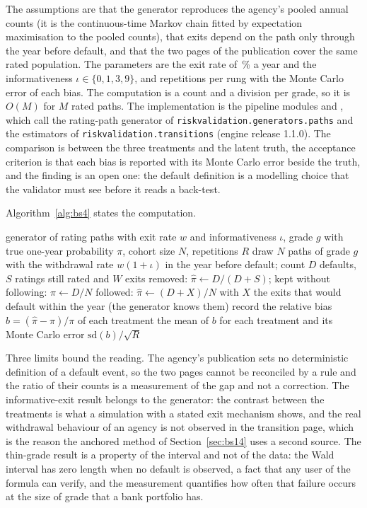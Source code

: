 The assumptions are that the generator reproduces the agency's pooled annual counts (it is the continuous-time Markov chain fitted by expectation
maximisation to the pooled counts), that exits depend on the path only through the year before default, and that the two pages of the publication cover
the same rated population. The parameters are the exit rate of \pxFourteenExitRate{}\,\% a year and the informativeness $\iota\in\{0,1,3,9\}$, and \pxFourReps{} repetitions per rung with the Monte Carlo error of each bias. The computation is a count and a division per grade, so it is
$O(M)$ for $M$ rated paths. The implementation is the pipeline modules  and , which call the rating-path generator
of \texttt{riskvalidation.generators.paths} and the estimators of \texttt{riskvalidation.transitions} (engine release 1.1.0). The comparison is between the three
treatments and the latent truth, the acceptance criterion is that each bias is reported with its Monte Carlo error beside the truth, and the finding is
an open one: the default definition is a modelling choice that the validator must see before it reads a back-test.

Algorithm~\ref{alg:bs4} states the computation.

\begin{algorithm}[htbp]
\caption{The three treatments of exiting ratings on simulated paths of known truth.}
\label{alg:bs4}
\begin{algorithmic}[1]
\Require generator of rating paths with exit rate $w$ and informativeness $\iota$, grade $g$ with true one-year probability $\pi$, cohort size $N$, repetitions $R$
  \State draw $N$ paths of grade $g$ with the withdrawal rate $w(1+\iota)$ in the year before default; count $D$ defaults, $S$ ratings still rated and $W$ exits
  \State removed: $\hat\pi\gets D/(D+S)$; \quad kept without following: $\hat\pi\gets D/N$
  \State followed: $\hat\pi\gets(D+X)/N$ with $X$ the exits that would default within the year (the generator knows them)
  \State record the relative bias $b=(\hat\pi-\pi)/\pi$ of each treatment
\EndFor
\State \Return the mean of $b$ for each treatment and its Monte Carlo error $\mathrm{sd}(b)/\sqrt{R}$
\end{algorithmic}
\end{algorithm}

Three limits bound the reading. The agency's publication sets no deterministic definition of a default event, so the two pages cannot be reconciled by a rule and the ratio of their counts is a measurement of the
gap and not a correction. The informative-exit result belongs to the generator: the contrast between the treatments is what a simulation with a stated exit mechanism shows, and the real withdrawal behaviour of an agency is
not observed in the transition page, which is the reason the anchored method of Section~\ref{sec:bs14} uses a second source. The thin-grade result is a property of the interval and not of the data: the Wald interval has zero length
when no default is observed, a fact that any user of the formula can verify, and the measurement quantifies how often that failure occurs at the size of grade that a bank portfolio has.

